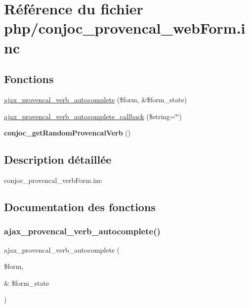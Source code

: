 \hypertarget{php_2conjoc__provencal__webForm_8inc}{}\section{Référence du fichier php/conjoc\+\_\+provencal\+\_\+web\+Form.inc}
\label{php_2conjoc__provencal__webForm_8inc}
\subsection*{Fonctions}
\begin{DoxyCompactItemize}
\item 
\hyperlink{php_2conjoc__provencal__webForm_8inc_aac31f536bfd83a81f1ea012f5ecdc9ad}{ajax\+\_\+provencal\+\_\+verb\+\_\+autocomplete} (\$form, \&\$form\+\_\+state)
\item 
\hyperlink{php_2conjoc__provencal__webForm_8inc_a2f2da1c5cc327e80252b73dd250aa363}{ajax\+\_\+provencal\+\_\+verb\+\_\+autocomplete\+\_\+callback} (\$string=\char`\"{}\char`\"{})
\item 
\hypertarget{php_2conjoc__provencal__webForm_8inc_a8e95bdf8c2d2a450e6485d589788aa83}{}\label{php_2conjoc__provencal__webForm_8inc_a8e95bdf8c2d2a450e6485d589788aa83} 
{\bfseries conjoc\+\_\+get\+Random\+Provencal\+Verb} ()
\end{DoxyCompactItemize}


\subsection{Description détaillée}
conjoc\+\_\+provencal\+\_\+verb\+Form.\+inc 

\subsection{Documentation des fonctions}
\hypertarget{php_2conjoc__provencal__webForm_8inc_aac31f536bfd83a81f1ea012f5ecdc9ad}{}\label{php_2conjoc__provencal__webForm_8inc_aac31f536bfd83a81f1ea012f5ecdc9ad} 
\subsubsection{\texorpdfstring{ajax\+\_\+provencal\+\_\+verb\+\_\+autocomplete()}{ajax\_provencal\_verb\_autocomplete()}}
{\footnotesize\ttfamily ajax\+\_\+provencal\+\_\+verb\+\_\+autocomplete (\begin{DoxyParamCaption}\item[{}]{\$form,  }\item[{\&}]{\$form\+\_\+state }\end{DoxyParamCaption})}

